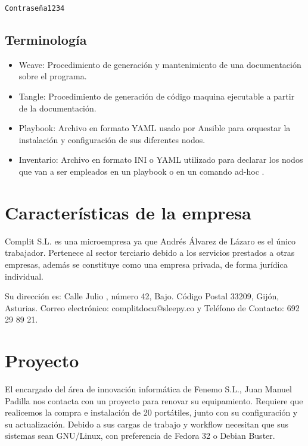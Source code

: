 \documentclass[11pt]{article}
\begin{document}
\begin{verbatim}
Contraseña1234
\end{verbatim}

\subsection{Terminología}
\label{sec:orgfc84ffc}

\begin{itemize}
\item Weave: Procedimiento de generación y mantenimiento de una documentación sobre el programa.
\item Tangle: Procedimiento de generación de código maquina ejecutable a partir de la documentación.
\item Playbook: Archivo en formato YAML usado por Ansible para orquestar la instalación y configuración de sus diferentes nodos.
\item Inventario: Archivo en formato INI o YAML utilizado para declarar los nodos que van a ser empleados en un playbook o en un comando ad-hoc \cite[pp. 17-44]{ansi2020}.
\end{itemize}

\section{Características de la empresa}
\label{sec:org40fb008}

Complit S.L. es una microempresa ya que Andrés Álvarez de Lázaro es el único trabajador. Pertenece al sector terciario debido a los servicios prestados a otras empresas, además se constituye como una empresa privada, de forma jurídica individual.

Su dirección es: Calle Julio , número 42, Bajo. Código Postal 33209, Gijón, Asturias. Correo electrónico: complitdocu@sleepy.co y Teléfono de Contacto: 692 29 89 21.

\section{Proyecto}
\label{sec:org2be7bea}

El encargado del área de innovación informática de Fenemo S.L., Juan Manuel Padilla nos contacta con un proyecto para renovar su equipamiento. Requiere que realicemos la compra e instalación de 20 portátiles, junto con su configuración y su actualización. Debido a sus cargas de trabajo y workflow necesitan que sus sistemas sean GNU/Linux, con preferencia de Fedora 32 o Debian Buster.
\end{document}

